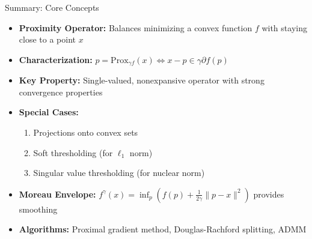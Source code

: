 \documentclass[aspectratio=169,10pt]{beamer}
\begin{document}
\begin{frame}{Summary: Core Concepts}
\begin{itemize}
    \item \textbf{Proximity Operator:} Balances minimizing a convex function $f$ with staying close to a point $x$

    \vspace{0.2cm}

    \item \textbf{Characterization:} $p = \mathrm{Prox}_{\gamma f}(x) \iff x - p \in \gamma \partial f(p)$

    \vspace{0.2cm}

    \item \textbf{Key Property:} Single-valued, nonexpansive operator with strong convergence properties

    \vspace{0.2cm}

    \item \textbf{Special Cases:}
    \begin{enumerate}
        \item Projections onto convex sets
        \item Soft thresholding (for $\ell_1$ norm)
        \item Singular value thresholding (for nuclear norm)
    \end{enumerate}

    \vspace{0.2cm}

    \item \textbf{Moreau Envelope:} $f^\gamma(x) = \inf_p(f(p) + \frac{1}{2\gamma}\|p-x\|^2)$ provides smoothing

    \vspace{0.2cm}

    \item \textbf{Algorithms:} Proximal gradient method, Douglas-Rachford splitting, ADMM
\end{itemize}
\end{frame}
\end{document}
